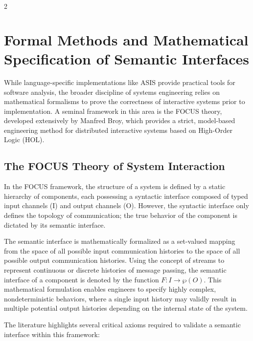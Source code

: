 \documentclass[11pt,letterpaper]{article}
\begin{document}
\begin{multicols*}{2}
\section{Formal Methods and Mathematical Specification of Semantic Interfaces}
While language-specific implementations like ASIS provide practical tools for software analysis, the broader discipline of systems engineering relies on mathematical formalisms to prove the correctness of interactive systems prior to implementation. A seminal framework in this area is the FOCUS theory, developed extensively by Manfred Broy, which provides a strict, model-based engineering method for distributed interactive systems based on High-Order Logic (HOL).

\subsection{The FOCUS Theory of System Interaction}
In the FOCUS framework, the structure of a system is defined by a static hierarchy of components, each possessing a syntactic interface composed of typed input channels (I) and output channels (O). However, the syntactic interface only defines the topology of communication; the true behavior of the component is dictated by its semantic interface.

The semantic interface is mathematically formalized as a set-valued mapping from the space of all possible input communication histories to the space of all possible output communication histories. Using the concept of streams to represent continuous or discrete histories of message passing, the semantic interface of a component is denoted by the function $F:I \to \wp(O)$. This mathematical formulation enables engineers to specify highly complex, nondeterministic behaviors, where a single input history may validly result in multiple potential output histories depending on the internal state of the system.

The literature highlights several critical axioms required to validate a semantic interface within this framework:


\end{multicols*}
\end{document}
